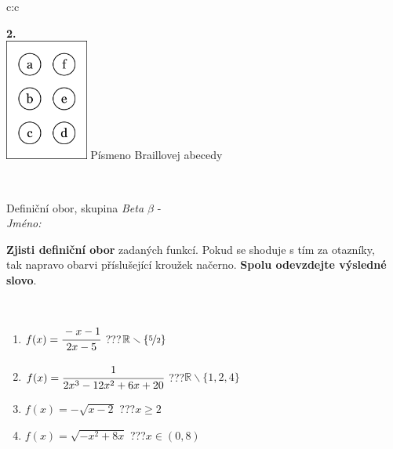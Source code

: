 \documentclass[10pt]{report}
\begin{document}
\begin{tabular}{c:c}
\begin{minipage}[c][104.5mm][t]{0.5\linewidth}
\begin{center}
\begin{minipage}{0.20\linewidth}
\begin{center}
{\Huge\bfseries 2.} \\[2mm]
\includegraphics[height=40mm]{../images/braille.png}
{\small Písmeno Braillovej abecedy}
\end{center}
\end{minipage}
\end{center}
\end{minipage}
\\ \hdashline
\begin{minipage}[c][104.5mm][t]{0.5\linewidth}
\begin{center}
\vspace{7mm}
{\huge Definiční obor, skupina \textit{Beta $\beta$} -}\\[5mm]
\textit{Jméno:}\phantom{xxxxxxxxxxxxxxxxxxxxxxxxxxxxxxxxxxxxxxxxxxxxxxxxxxxxxxxxxxxxxxxxx}\\[5mm]
\begin{minipage}{0.95\linewidth}
\begin{center}
\textbf{Zjisti definiční obor} zadaných funkcí. Pokud se shoduje s tím za otazníky,\\tak napravo obarvi příslušející kroužek načerno. \textbf{Spolu odevzdejte výsledné slovo}.
\end{center}
\end{minipage}
\\[1mm]
\begin{minipage}{0.79\linewidth}
\begin{center}
\begin{varwidth}{\linewidth}
\begin{enumerate}
\normalsizerrr
\item $f(x)=\cfrac{-x-1}{2x-5}$\quad \dotfill\; ???\;\dotfill \quad $\mathbb{R}\smallsetminus\{\nicefrac{5}{2}\}$
\item $f(x)=\cfrac{1}{2x^3-12x^2+6x+20}$\quad \dotfill\; ???\;\dotfill \quad $\mathbb{R}\smallsetminus\{1,2,4\}$
\item $f(x)=-\sqrt{x-2}$\quad \dotfill\; ???\;\dotfill \quad $x\geq2$
\item $f(x)=\sqrt{-x^2+8x}$\quad \dotfill\; ???\;\dotfill \quad $x\in(0 , 8)$

\end{enumerate}
\end{varwidth}
\end{center}
\end{minipage}
\end{center}
\end{minipage}
\end{tabular}
\end{document}
